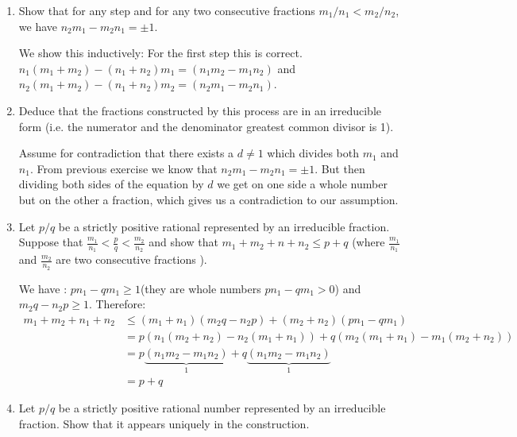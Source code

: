 \documentclass[a4paper,11pt]{exam}
\begin{document}
\begin{questions}
\begin{enumerate}
\begin{solution}
	\end{solution}
	
	\item  Show that for any step and for any two consecutive fractions $m_1/n_1 < m_2/n_2$, we have $n_2m_1 - m_2n_1 = \pm 1$.
	
	\begin{solution}
		We show this inductively: For the first step this is correct.
		$n_1(m_1+m_2)-(n_1+n_2)m_1 = (n_1m_2-m_1n_2)$ and $n_2(m_1+m_2)-(n_1+n_2)m_2= (n_2m_1-m_2n_1)$.
	\end{solution}
	
	\item Deduce that the fractions constructed by this process are in an irreducible form (i.e. the numerator and the denominator greatest common divisor is 1).
	
	\begin{solution}
		Assume for contradiction that there exists a $d\neq 1$ which divides both $m_1$ and $n_1$. From previous exercise  we know that $n_2m_1 - m_2n_1 = \pm1$.  But then dividing both sides of the equation by $d$ we get on one side a whole number but on the other a fraction, which gives us a contradiction to our assumption.
	\end{solution}
	
	\item Let $p/q$ be a strictly positive rational represented by an irreducible fraction. Suppose that $\frac{m_1}{n_1} < \frac{p}{q} <
	\frac{m_2}{n_2}$ and show that $m_1+m_2+n+n_2 \leq p+q$ (where $\frac{m_1}{n_1}$ and $\frac{m_2}{n_2}$ are two consecutive fractions ).
	
	\begin{solution}
		We have : $pn_1-qm_1 \geq 1$(they are whole numbers $pn_1-qm_1>0$) and $m_2q-n_2p \geq 1$. Therefore:
		\begin{align*}
		m_1+m_2+n_1+n_2 & \leq (m_1+n_1)(m_2q-n_2p)+(m_2+n_2)(pn_1-qm_1) \\
		& = p(n_1(m_2+n_2)-n_2(m_1+n_1))+q(m_2(m_1+n_1)-m_1(m_2+n_2)) \\
		& = p\underbrace{(n_1m_2-m_1n_2)}_1+q\underbrace{(n_1m_2-m_1n_2)}_1 \\
		& = p+q
		\end{align*}
	\end{solution}
	
	\item Let $p/q$ be a strictly positive rational number represented by an irreducible fraction. Show that it appears uniquely in the construction.
	

\end{enumerate}
\end{questions}
\end{document}
